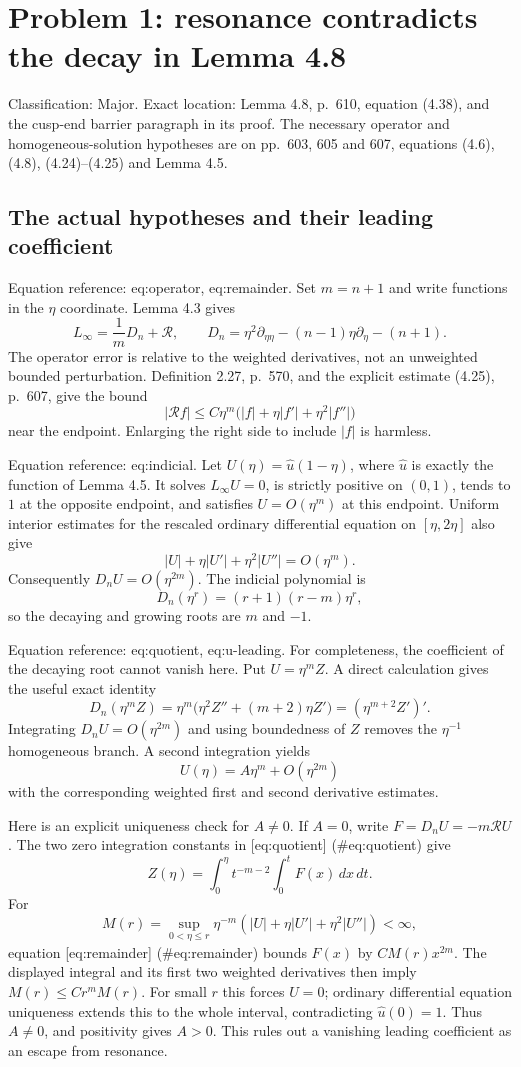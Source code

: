 \documentclass[10pt]{article}
\begin{document}
\section*{Problem 1: resonance contradicts the decay in Lemma 4.8}
Classification: Major. Exact location: Lemma 4.8, p. 610, equation (4.38), and the cusp-end barrier paragraph in its proof. The necessary operator and homogeneous-solution hypotheses are on pp. 603, 605 and 607, equations (4.6), (4.8), (4.24)–(4.25) and Lemma 4.5.\par
\subsection*{The actual hypotheses and their leading coefficient}
Equation reference: eq:operator, eq:remainder. Set \(m=n+1\) and write functions in the \(\eta\) coordinate. Lemma 4.3 gives \[L_\infty=\frac1m D_n+\mathcal R,\qquad
 D_n=\eta^2\partial_{\eta\eta}-(n-1)\eta\partial_\eta-(n+1).
 \] The operator error is relative to the weighted derivatives, not an unweighted bounded perturbation. Definition 2.27, p. 570, and the explicit estimate (4.25), p. 607, give the bound \[|\mathcal R f|\leq C\eta^m
     \bigl(|f|+\eta|f'|+\eta^2|f''|\bigr)
 \] near the endpoint. Enlarging the right side to include \(|f|\) is harmless.\par
Equation reference: eq:indicial. Let \(U(\eta)=\widehat u(1-\eta)\), where \(\widehat u\) is exactly the function of Lemma 4.5. It solves \(L_\infty U=0\), is strictly positive on \((0,1)\), tends to \(1\) at the opposite endpoint, and satisfies \(U=O(\eta^m)\) at this endpoint. Uniform interior estimates for the rescaled ordinary differential equation on \([\eta,2\eta]\) also give \[|U|+\eta|U'|+\eta^2|U''|=O(\eta^m).\] Consequently \(D_nU=O(\eta^{2m})\). The indicial polynomial is \[D_n(\eta^r)=(r+1)(r-m)\eta^r,
 \] so the decaying and growing roots are \(m\) and \(-1\).\par
Equation reference: eq:quotient, eq:u-leading. For completeness, the coefficient of the decaying root cannot vanish here. Put \(U=\eta^m Z\). A direct calculation gives the useful exact identity \[D_n(\eta^m Z)
   =\eta^m\bigl(\eta^2Z''+(m+2)\eta Z'\bigr)
   =(\eta^{m+2}Z')'.
 \] Integrating \(D_nU=O(\eta^{2m})\) and using boundedness of \(Z\) removes the \(\eta^{-1}\) homogeneous branch. A second integration yields \[U(\eta)=A\eta^m+O(\eta^{2m})
 \] with the corresponding weighted first and second derivative estimates.\par
Here is an explicit uniqueness check for \(A\neq0\). If \(A=0\), write \(F=D_nU=-m\mathcal RU\). The two zero integration constants in [eq:quotient] (\#eq:quotient) give \[Z(\eta)=\int_0^\eta t^{-m-2}\int_0^t F(x)\,dx\,dt.\] For \[M(r)=\sup_{0<\eta\leq r}\eta^{-m}
              (|U|+\eta|U'|+\eta^2|U''|)<\infty,\] equation [eq:remainder] (\#eq:remainder) bounds \(F(x)\) by \(CM(r)x^{2m}\). The displayed integral and its first two weighted derivatives then imply \(M(r)\leq Cr^mM(r)\). For small \(r\) this forces \(U=0\); ordinary differential equation uniqueness extends this to the whole interval, contradicting \(\widehat u(0)=1\). Thus \(A\neq0\), and positivity gives \(A>0\). This rules out a vanishing leading coefficient as an escape from resonance.\par
\end{document}
